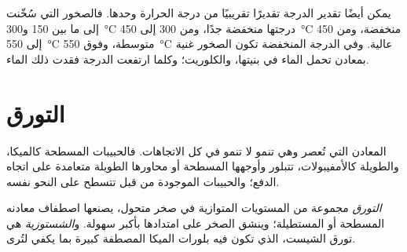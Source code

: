 يمكن أيضًا تقدير الدرجة تقديرًا تقريبيًا من درجة الحرارة وحدها. فالصخور التي سُخّنت إلى ما بين 150
و\qty{300}{\celsius} درجتها منخفضة جدًا، ومن 300 إلى \qty{450}{\celsius}
منخفضة، ومن 450 إلى \qty{550}{\celsius} متوسطة، وفوق
\qty{550}{\celsius} عالية. وفي الدرجة المنخفضة تكون الصخور غنية
بمعادن تحمل الماء في بنيتها،  والكلوريت؛ وكلما
ارتفعت الدرجة فقدت ذلك الماء.

\section{التورق}\label{sec:g12:metamorphic-rocks:foliation}

المعادن التي تُعصر وهي تنمو لا تنمو في كل الاتجاهات. فالحبيبات
المسطحة كالميكا، والطويلة كالأمفيبولات، تتبلور
وأوجهها المسطحة أو محاورها الطويلة متعامدة على اتجاه الدفع؛ والحبيبات الموجودة من قبل تتسطح على النحو
نفسه.

\begin{definition}\label{def:g12:metamorphic-rocks:foliation}
\emph{التورق} مجموعة من المستويات المتوازية في
صخر متحول، يصنعها اصطفاف معادنه المسطحة أو المستطيلة؛
وينشق الصخر على امتدادها بأكبر سهولة. و\emph{الشستوزية}
هي تورق الشيست، الذي تكون فيه بلورات الميكا المصطفة كبيرة
بما يكفي لتُرى.
\end{definition}

